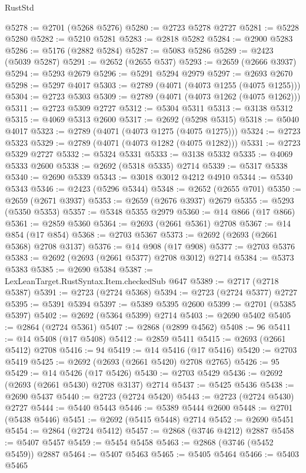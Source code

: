 \begin{lexlean}{RustStd}
\begin{coremodule}
@5278 := @2701 (@5268 @5276)
@5280 := @2723 @5278 @2727
@5281 := @5228 @5280
@5282 := @5210 @5281
@5283 := @2818 @5282
@5284 := @2900 @5283
@5286 := @5176 (@2882 @5284)
@5287 := @5083 @5286
@5289 := @2423 (@5039 @5287)
@5291 := @2652 (@2655 @537)
@5293 := @2659 (@2666 @3937)
@5294 := @5293 @2679
@5296 := @5291 @5294 @2979
@5297 := @2693 @2670
@5298 := @5297 @4017
@5303 := @2789 (@4071 (@4073 @1255 (@4075 @1255)))
@5304 := @2723 @5303
@5309 := @2789 (@4071 (@4073 @1262 (@4075 @1262)))
@5311 := @2723 @5309 @2727
@5312 := @5304 @5311
@5313 := @3138 @5312
@5315 := @4069 @5313 @2600
@5317 := @2692 (@5298 @5315)
@5318 := @5040 @4017
@5323 := @2789 (@4071 (@4073 @1275 (@4075 @1275)))
@5324 := @2723 @5323
@5329 := @2789 (@4071 (@4073 @1282 (@4075 @1282)))
@5331 := @2723 @5329 @2727
@5332 := @5324 @5331
@5333 := @3138 @5332
@5335 := @4069 @5333 @2600
@5338 := @2692 (@5318 @5335) @2714
@5339 := @5317 @5338
@5340 := @2690 @5339
@5343 := @3018 @3012 @4212 @4910
@5344 := @5340 @5343
@5346 := @2423 (@5296 @5344)
@5348 := @2652 (@2655 @701)
@5350 := @2659 (@2671 @3937)
@5353 := @2659 (@2676 @3937) @2679
@5355 := @5293 (@5350 @5353)
@5357 := @5348 @5355 @2979
@5360 := @14 @866 (@17 @866)
@5361 := @2859 @5360
@5364 := @2693 (@2661 @5361) @2708
@5367 := @14 @854 (@17 @854)
@5368 := @2703 @5367
@5373 := @2692 (@2693 (@2661 @5368) @2708 @3137)
@5376 := @14 @908 (@17 @908)
@5377 := @2703 @5376
@5383 := @2692 (@2693 (@2661 @5377) @2708 @3012) @2714
@5384 := @5373 @5383
@5385 := @2690 @5384
@5387 := LexLeanTarget.RustSyntax.Item.checkedSub @647
@5389 := @2717 (@2718 @5387)
@5391 := @2723 (@2724 @5368)
@5394 := @2723 (@2724 @5377) @2727
@5395 := @5391 @5394
@5397 := @5389 @5395 @2600
@5399 := @2701 (@5385 @5397)
@5402 := @2692 (@5364 @5399) @2714
@5403 := @2690 @5402
@5405 := @2864 (@2724 @5361)
@5407 := @2868 (@2899 @4562)
@5408 := 96
@5411 := @14 @5408 (@17 @5408)
@5412 := @2859 @5411
@5415 := @2693 (@2661 @5412) @2708
@5416 := 94
@5419 := @14 @5416 (@17 @5416)
@5420 := @2703 @5419
@5425 := @2692 (@2693 (@2661 @5420) @2708 @2765)
@5426 := 95
@5429 := @14 @5426 (@17 @5426)
@5430 := @2703 @5429
@5436 := @2692 (@2693 (@2661 @5430) @2708 @3137) @2714
@5437 := @5425 @5436
@5438 := @2690 @5437
@5440 := @2723 (@2724 @5420)
@5443 := @2723 (@2724 @5430) @2727
@5444 := @5440 @5443
@5446 := @5389 @5444 @2600
@5448 := @2701 (@5438 @5446)
@5451 := @2692 (@5415 @5448) @2714
@5452 := @2690 @5451
@5454 := @2864 (@2724 @5412)
@5457 := @2868 (@3746 @4212) @2887
@5458 := @5407 @5457
@5459 := @5454 @5458
@5463 := @2868 (@3746 (@5452 @5459)) @2887
@5464 := @5407 @5463
@5465 := @5405 @5464
@5466 := @5403 @5465

\end{coremodule}
\end{lexlean}
